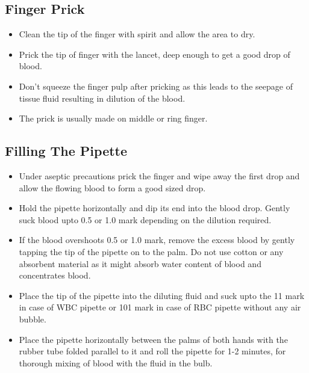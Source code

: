 \documentclass[a4paper,12pt]{book}
\begin{document}
					\subsection*{Finger Prick}
					\begin{itemize}
						\item{Clean the tip of the finger with spirit and allow the area to dry.}
						\item{Prick the tip of finger with the lancet, deep enough to get a good drop of blood.}
						\item{Don’t squeeze the finger pulp after pricking as this leads to the seepage of tissue fluid resulting in dilution of the blood.}
						\item{The prick is usually made on middle or ring finger.}
					\end{itemize}

					\subsection*{Filling The Pipette}
					\begin{itemize}

						\item{Under aseptic precautions prick the finger and wipe away the first drop and allow the flowing blood to form a good sized drop.}
						\item{Hold the pipette horizontally and dip its end into the blood drop. Gently suck blood upto 0.5 or 1.0 mark depending on the dilution required.}

						\item{If the blood overshoots 0.5 or 1.0 mark, remove the excess blood by gently tapping the tip of the pipette on to the palm. Do not use cotton or any absorbent material as it might absorb water content of blood and concentrates blood.}
						\item{Place the tip of the pipette into the diluting fluid and suck upto the 11 mark in case of WBC pipette or 101 mark in case of RBC pipette without any air bubble.}
						\item{Place the pipette horizontally between the palms of both hands with the rubber tube folded parallel to it and roll the pipette for 1-2 minutes, for thorough mixing of blood with the fluid in the bulb.}

					\end{itemize}
\end{document}
